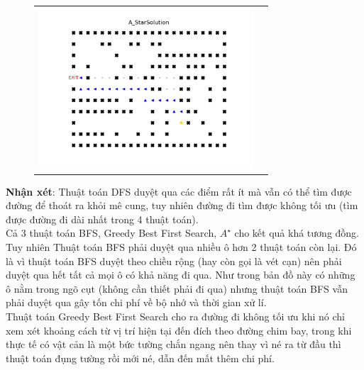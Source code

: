 \documentclass[11pt]{article} %
\begin{document}
\begin{itemize}
\begin{figure}[h]
\begin{tabular}{cc}
				\includegraphics[width=8cm]{Figures/fg1_astar.png}
			\end{tabular}
		\end{figure}
		
		\textbf{Nhận xét}: Thuật toán DFS duyệt qua các điểm rất ít mà vẫn có thể tìm được đường để thoát ra khỏi mê cung, tuy nhiên đường đi tìm được không tối ưu (tìm được đường đi dài nhất trong 4 thuật toán).\\ Cả 3 thuật toán BFS, Greedy Best First Search, $A^{\star}$ cho kết quả khá tương đồng. \\Tuy nhiên Thuật toán BFS phải duyệt qua nhiều ô hơn 2 thuật toán còn lại. Đó là vì thuật toán BFS duyệt theo chiều rộng (hay còn gọi là vét cạn) nên phải duyệt qua hết tất cả mọi ô có khả năng đi qua. Như trong bản đồ này có những ô nằm trong ngõ cụt (không cần thiết phải đi qua) nhưng thuật toán BFS vẫn phải duyệt qua gây tốn chi phí về bộ nhớ và thời gian xử lí.\\Thuật toán Greedy Best First Search cho ra đường đi không tối ưu khi nó chỉ xem xét khoảng cách từ vị trí hiện tại đến đích theo đường chim bay, trong khi thực tế có vật cản là một bức tường chắn ngang nên thay vì né ra từ đầu thì thuật toán đụng tường rồi mới né, dẫn đến mất thêm chi phí.
		

\end{itemize}
\end{document}
